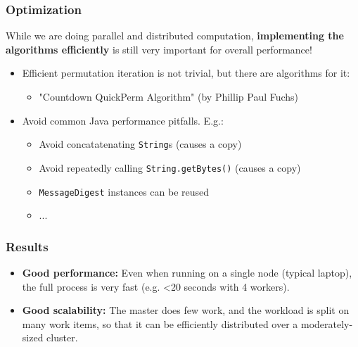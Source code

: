 \documentclass{beamer}
\begin{document}
\begin{frame}
	\frametitle{Optimization}

	While we are doing parallel and distributed computation, \textbf{implementing the algorithms efficiently} is still very important for overall performance!

	\begin{itemize}

		\item Efficient permutation iteration is not trivial, but there are algorithms for it:

		\begin{itemize}

			\item "Countdown QuickPerm Algorithm" (by Phillip Paul Fuchs)

		\end{itemize}

		\pause

		\item Avoid common Java performance pitfalls. E.g.:

		\begin{itemize}

			\item Avoid concatatenating \texttt{String}s (causes a copy)

			\item Avoid repeatedly calling \texttt{String.getBytes()} (causes a copy)

			\item \texttt{MessageDigest} instances can be reused

			\item ...

		\end{itemize}
	\end{itemize}
\end{frame}

\begin{frame}
	\frametitle{Results}

	\begin{itemize}

		\item \textbf{Good performance:} Even when running on a single node (typical laptop), the full process is very fast (e.g. <20 seconds with 4 workers).

		\item \textbf{Good scalability:} The master does few work, and the workload is split on many work items, so that it can be efficiently distributed over a moderately-sized cluster.

	\end{itemize}

\end{frame}
\end{document}
